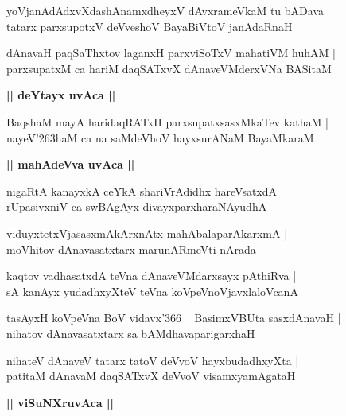 \documentclass[twoside,12pt,openright]{book}
\def\S{\char'263}
\newcounter{shloka}[chapter]
\def\uvaca#1{\centerline{{\large\textbf{#1}}}}
\begin{document}
\begin{shloka}%
yoVjanAdAdxvXdashAnamxdheyxV dAvxrameVkaM tu bADava |\\
tatarx parxsupotxV deVveshoV BayaBiVtoV janAdaRnaH 
\end{shloka}

\begin{shloka}%
dAnavaH paqSaThxtov laganxH parxviSoTxV mahatiVM huhAM |\\
parxsupatxM ca hariM daqSATxvX dAnaveVMderxVNa BASitaM 
\end{shloka}

\uvaca{|| deYtayx uvAca ||}

\begin{shloka}%
BaqshaM mayA haridaqRATxH parxsupatxsasxMkaTev kathaM |\\
nayeV\S haM ca na saMdeVhoV hayxsurANaM BayaMkaraM 
\end{shloka}

\uvaca{|| mahAdeVva uvAca ||}

\begin{shloka}%
nigaRtA kanayxkA ceYkA shariVrAdidhx hareVsatxdA |\\
rUpasivxniV ca swBAgAyx divayxparxharaNAyudhA
\end{shloka}

\begin{shloka}%
viduyxtetxVjasasxmAkArxnAtx mahAbalaparAkarxmA |\\
moVhitov dAnavasatxtarx marunARmeVti nArada 
\end{shloka}

\begin{shloka}%
kaqtov vadhasatxdA teVna dAnaveVMdarxsayx pAthiRva |\\
sA kanAyx yudadhxyXteV teVna koVpeVnoVjavxlaloVcanA
\end{shloka}

\begin{shloka}%
tasAyxH koVpeVna BoV vidavx\char'366 ~ BasimxVBUta sasxdAnavaH |\\
nihatov dAnavasatxtarx sa bAMdhavaparigarxhaH
\end{shloka}

\begin{shloka}%
nihateV dAnaveV tatarx tatoV deVvoV hayxbudadhxyXta |\\
patitaM dAnavaM daqSATxvX deVvoV visamxyamAgataH 
\end{shloka}

\uvaca{|| viSuNXruvAca ||}
\end{document}
